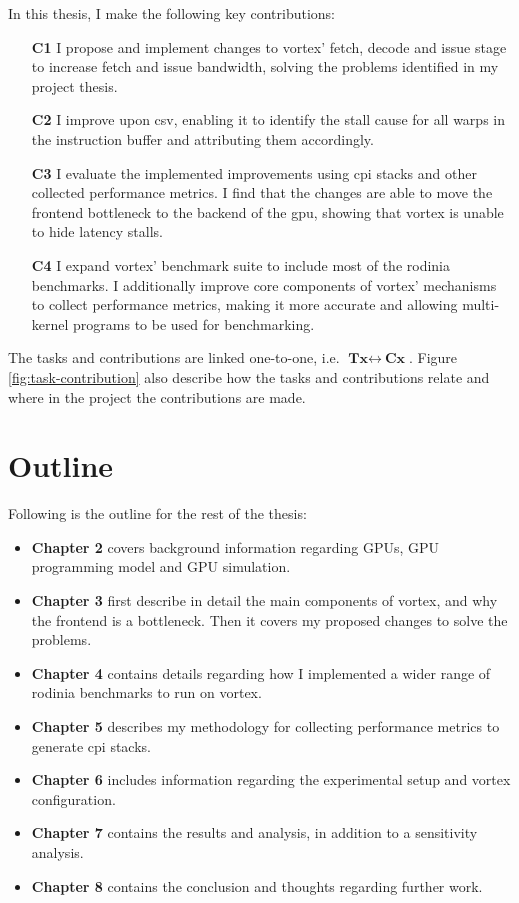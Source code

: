 In this thesis, I make the following key contributions:
\begin{itemize}
    \item[\textbf{C1}] I propose and implement changes to \Gls{vortex}' fetch, decode and issue stage to increase fetch and issue bandwidth, solving the problems identified in my project thesis.
    \item[\textbf{C2}] I improve upon \acrshort{csv}, enabling it to identify the stall cause for all warps in the instruction buffer and attributing them accordingly.
    \item[\textbf{C3}] I evaluate the implemented improvements using \acrshort{cpi} stacks and other collected performance metrics. I find that the changes are able to move the frontend bottleneck to the backend of the \Gls{gpu}, showing that \Gls{vortex} is unable to hide latency stalls.
    \item[\textbf{C4}] I expand \Gls{vortex}' benchmark suite to include most of the \Gls{rodinia} benchmarks. I additionally improve core components of \Gls{vortex}' mechanisms to collect performance metrics, making it more accurate and allowing multi-kernel programs to be used for benchmarking.  
\end{itemize}

The tasks and contributions are linked one-to-one, i.e. $\textbf{Tx}\leftrightarrow~\textbf{Cx}$. Figure \ref{fig:task-contribution} also describe how the tasks and contributions relate and where in the project the contributions are made.

\section{Outline}

Following is the outline for the rest of the thesis:

\begin{itemize}
    \item \textbf{Chapter 2} covers background information regarding GPUs, GPU programming model and GPU simulation.
    \item \textbf{Chapter 3} first describe in detail the main components of \Gls{vortex}, and why the frontend is a bottleneck. Then it covers my proposed changes to solve the problems.
    \item \textbf{Chapter 4} contains details regarding how I implemented a wider range of \Gls{rodinia} benchmarks to run on \Gls{vortex}.
    \item \textbf{Chapter 5} describes my methodology for collecting performance metrics to generate \acrshort{cpi} stacks.
    \item \textbf{Chapter 6} includes information regarding the experimental setup and \Gls{vortex} configuration.
    \item \textbf{Chapter 7} contains the results and analysis, in addition to a sensitivity analysis.
    \item \textbf{Chapter 8} contains the conclusion and thoughts regarding further work.
\end{itemize}

